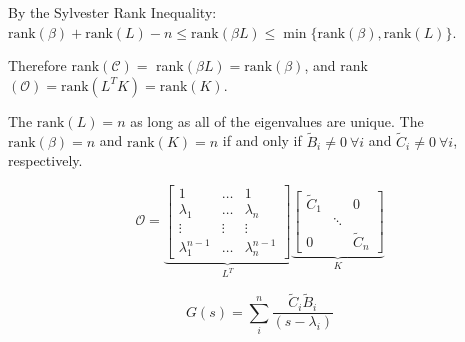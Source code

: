 \documentclass[a4paper, 11 pt]{article}
\begin{document}
    By the Sylvester Rank Inequality: $\text{rank}(\beta) + \text{rank}(L) - n \leq \text{rank}(\beta L) \leq \min\{\text{rank}(\beta) , \text{rank}(L)\}$. 
    
    Therefore rank$(\mathcal{C}) =$ rank$(\beta L) = \text{rank}(\beta)$, and rank$(\mathcal{O}) = \text{rank}(L^{T} K) = \text{rank}(K)$. 

    The $\text{rank}(L) = n$ as long as all of the eigenvalues are unique. The $\text{rank}(\beta) = n$ and $\text{rank}(K) = n$ if and only if $\tilde{B}_{i} \neq 0 \ \forall i$ and $\tilde{C}_{i} \neq 0 \ \forall i$, respectively. 

    \begin{equation}
      \mathcal{O} = \underbrace{\begin{bmatrix} 1 & \hdots & 1 \\ \lambda_{1} & \hdots & \lambda_{n} \\ \vdots & \vdots & \vdots \\ \lambda_{1}^{n-1} & \hdots & \lambda_{n}^{n-1} \end{bmatrix}}_{L^{T}} \underbrace{\begin{bmatrix} \tilde{C}_{1} & & 0 \\ & \ddots & \\ 0 & & \tilde{C}_{n} \end{bmatrix}}_{K}
    \end{equation}

   \begin{equation}
     G(s) = \sum_{i}^{n} \frac{\tilde{C}_{i} \tilde{B}_{i}}{(s-\lambda_{i})}
   \end{equation}
\end{document}
